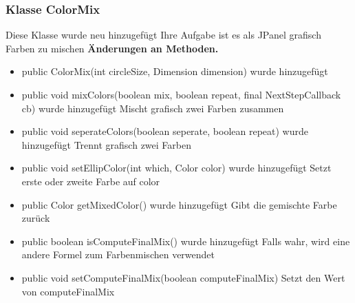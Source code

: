 \documentclass{article}
\begin{document}
	\subsubsection{Klasse ColorMix}
    Diese Klasse wurde neu hinzugefügt
    Ihre Aufgabe ist es als JPanel grafisch Farben zu mischen
    \textbf{Änderungen an Methoden.}\newline
	   \begin{itemize}
           \item public ColorMix(int circleSize, Dimension dimension) wurde hinzugefügt\newline
           \item public void mixColors(boolean mix, boolean repeat, final NextStepCallback cb) wurde hinzugefügt\newline
               Mischt grafisch zwei Farben zusammen
           \item public void seperateColors(boolean seperate, boolean repeat) wurde hinzugefügt\newline
               Trennt grafisch zwei Farben
           \item public void setEllipColor(int which, Color color) wurde hinzugefügt\newline
               Setzt erste oder zweite Farbe auf color
           \item public Color getMixedColor() wurde hinzugefügt\newline
               Gibt die gemischte Farbe zurück
           \item public boolean isComputeFinalMix() wurde hinzugefügt\newline
               Falls wahr, wird eine andere Formel zum Farbenmischen verwendet
           \item public void setComputeFinalMix(boolean computeFinalMix)\newline
               Setzt den Wert von computeFinalMix
           \end{itemize}
\end{document}
